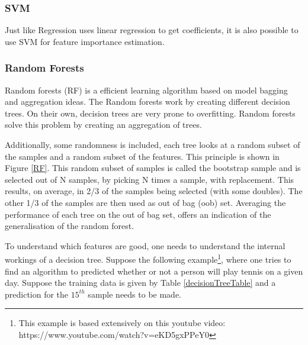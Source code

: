 \subsubsection{SVM}
Just like Regression uses linear regression to get coefficients, it is also possible to use SVM for feature importance estimation.

\subsubsection{Random Forests}
Random forests (RF)  is a efficient learning algorithm based on model bagging and aggregation ideas\citep{rfPaper}. The Random forests work by creating different decision trees. On their own, decision trees are very prone to overfitting. Random forests solve this problem by creating an aggregation of trees. 

\npar

Additionally, some randomness is included, each tree looks at a random subset of the samples and a random subset of the features. This principle is shown in Figure \ref{RF}. This random subset of samples is called the bootstrap sample and is selected out of N samples, by picking N times a sample, with replacement. This results, on average, in 2/3 of the samples being selected (with some doubles). The other 1/3 of the samples are then used as out of bag (oob)  set. Averaging the performance of each tree on the out of bag set, offers an indication of the generalisation of the random forest.


\npar

To understand which features are good, one needs to understand the internal workings of a decision tree. Suppose the following example\footnote{This example is based extensively on this youtube video: https://www.youtube.com/watch?v=eKD5gxPPeY0}, where one tries to find an algorithm to predicted whether or not a person will play tennis on a given day. Suppose the training data is given by Table \ref{decisionTreeTable} and a prediction for the $15^{th}$ sample needs to be made.

